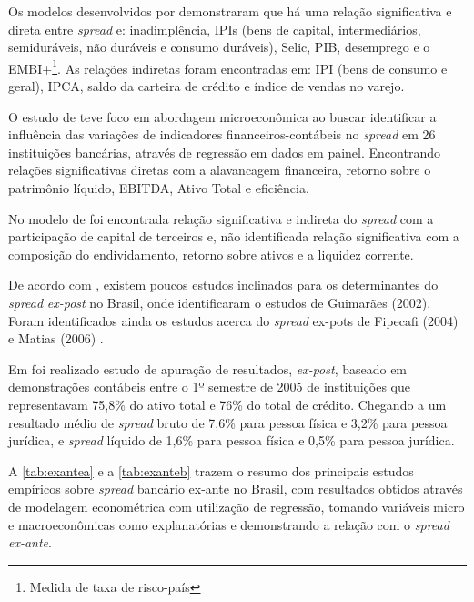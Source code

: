 \documentclass[12pt,12pt,openright,oneside,a4paper,chapter=TITLE,section=TITLE,subsection=TITLE,subsubsection=TITLE,english,french,spanish,portugues,sumario=tradicional]{abntex2}
\begin{document}
Os modelos desenvolvidos por \textcite{durigan:2018} demonstraram que há uma relação significativa e direta entre \emph{spread} e: inadimplência, IPIs (bens de capital, intermediários, semiduráveis, não duráveis e consumo duráveis), Selic, PIB, desemprego e o EMBI+\footnote{Medida de taxa de risco-país}. As relações indiretas foram encontradas em: IPI (bens de consumo e geral), IPCA, saldo da carteira de crédito e índice de vendas no varejo.

O estudo de \textcite{timotio:2018} teve foco em abordagem microeconômica ao
buscar identificar a influência das variações de indicadores
financeiros-contábeis no \emph{spread} em 26 instituições bancárias,
através de regressão em dados em painel. Encontrando relações significativas
diretas com a alavancagem financeira, retorno sobre o patrimônio líquido,
EBITDA, Ativo Total e eficiência.

No modelo de \textcite{timotio:2018} foi encontrada relação significativa e
indireta do \emph{spread} com a participação de capital de terceiros e, não
identificada relação significativa com a composição do endividamento, retorno
sobre ativos e a liquidez corrente.

De acordo com \textcite{durigan:2018, dantas:2012}, existem poucos estudos
inclinados para os determinantes do \emph{spread} \emph{ex-post} no Brasil, onde
identificaram o estudos de Guimarães (2002). Foram identificados ainda os
estudos acerca do \emph{spread} ex-pots de Fipecafi (2004) \cite{dantas:2012} e Matias (2006) \cite{leal:2006}.

Em \textcite{fipecafi:2005} foi realizado estudo de apuração de resultados,
\emph{ex-post}, baseado em demonstrações contábeis entre o 1º semestre de 2005 de
instituições que representavam 75,8\% do ativo total e 76\% do total de crédito.
Chegando a um resultado médio de \emph{spread} bruto de 7,6\% para pessoa física e
3,2\% para pessoa jurídica, e \emph{spread} líquido de 1,6\% para pessoa física e 0,5\%
para pessoa jurídica.

A \autoref{tab:exantea} e a \autoref{tab:exanteb} trazem o resumo dos
principais estudos empíricos sobre \emph{spread} bancário ex-ante no Brasil, com
resultados obtidos através de modelagem econométrica com utilização de
regressão, tomando variáveis micro e macroeconômicas como explanatórias e
demonstrando a relação com o \emph{spread ex-ante}.
\end{document}
